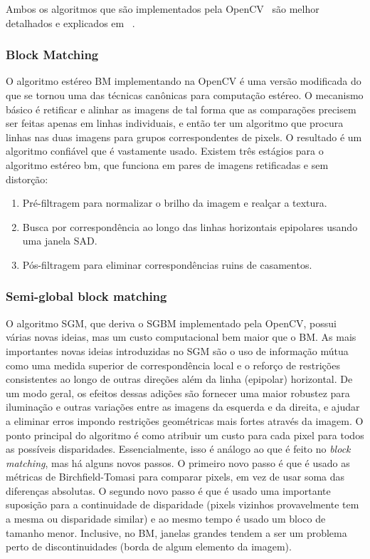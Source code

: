 \documentclass{bmvc2k}
\begin{document}
Ambos os algoritmos que são implementados pela OpenCV~\cite{OpenCV} são melhor detalhados e explicados em ~\cite{kaehler2016learning}.
\subsubsection{Block Matching}
O algoritmo estéreo BM implementando na OpenCV é uma versão modificada do que se tornou uma das técnicas canônicas para computação estéreo. O mecanismo básico é retificar e alinhar as imagens de tal forma que as comparações precisem ser feitas apenas em linhas individuais, e então ter um algoritmo que procura linhas nas duas imagens para grupos correspondentes de pixels. O resultado é um algoritmo confiável que é vastamente usado. Existem três estágios para o algoritmo estéreo bm, que funciona em pares de imagens retificadas e sem distorção:
\begin{enumerate}
\item Pré-filtragem para normalizar o brilho da imagem e realçar a textura.
\item Busca por correspondência ao longo das linhas horizontais epipolares usando uma janela SAD.
\item Pós-filtragem para eliminar correspondências ruins de casamentos.
\end{enumerate}
\subsubsection{Semi-global block matching}
O algoritmo SGM, que deriva o SGBM implementado pela OpenCV, possui várias novas ideias, mas um custo computacional bem maior que o BM. As mais importantes novas ideias introduzidas no SGM são o uso de informação mútua como uma medida superior de correspondência local e o reforço de restrições consistentes ao longo de outras direções além da linha (epipolar) horizontal. De um modo geral, os efeitos dessas adições são fornecer uma maior robustez para iluminação e outras variações entre as imagens da esquerda e da direita, e ajudar a eliminar erros impondo restrições geométricas mais fortes através da imagem. O ponto principal do algoritmo é como atribuir um custo para cada pixel para todos as possíveis disparidades. Essencialmente, isso é análogo ao que é feito no \textit{block matching}, mas há alguns novos passos. O primeiro novo passo é que é usado as métricas de Birchfield-Tomasi para comparar pixels, em vez de usar soma das diferenças absolutas. O segundo novo passo é que é usado uma importante suposição para a continuidade de disparidade (pixels vizinhos provavelmente tem a mesma ou disparidade similar) e ao mesmo tempo é usado um bloco de tamanho menor. Inclusive, no BM, janelas grandes tendem a ser um problema perto de discontinuidades (borda de algum elemento da imagem).
\end{document}
